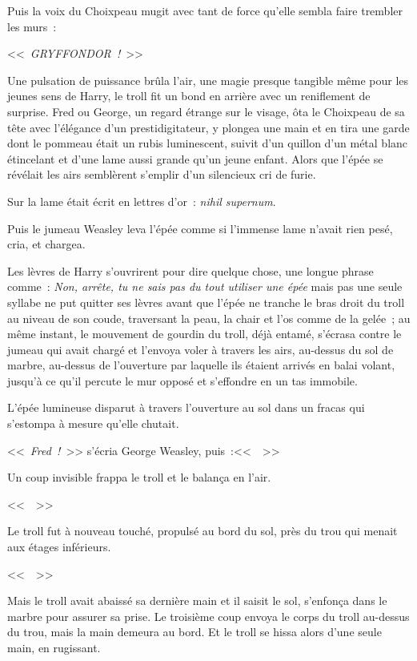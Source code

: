 Puis la voix du Choixpeau mugit avec tant de force qu'elle sembla faire trembler les murs~:

<<~\emph{GRYFFONDOR~!}~>>

Une pulsation de puissance brûla l'air, une magie presque tangible même pour les jeunes sens de Harry, le troll fit un bond en arrière avec un reniflement de surprise. Fred ou George, un regard étrange sur le visage, ôta le Choixpeau de sa tête avec l'élégance d'un prestidigitateur, y plongea une main et en tira une garde dont le pommeau était un rubis luminescent, suivit d'un quillon d'un métal blanc étincelant et d'une lame aussi grande qu'un jeune enfant. Alors que l'épée se révélait les airs semblèrent s'emplir d'un silencieux cri de furie.

Sur la lame était écrit en lettres d'or~: \emph{nihil supernum}.

Puis le jumeau Weasley leva l'épée comme si l'immense lame n'avait rien pesé, cria, et chargea.

Les lèvres de Harry s'ouvrirent pour dire quelque chose, une longue phrase comme~: \emph{Non, arrête, tu ne sais pas du tout utiliser une épée} mais pas une seule syllabe ne put quitter ses lèvres avant que l'épée ne tranche le bras droit du troll au niveau de son coude, traversant la peau, la chair et l'os comme de la gelée~; au même instant, le mouvement de gourdin du troll, déjà entamé, s'écrasa contre le jumeau qui avait chargé et l'envoya voler à travers les airs, au-dessus du sol de marbre, au-dessus de l'ouverture par laquelle ils étaient arrivés en balai volant, jusqu'à ce qu'il percute le mur opposé et s'effondre en un tas immobile.

L'épée lumineuse disparut à travers l'ouverture au sol dans un fracas qui s'estompa à mesure qu'elle chutait.

<<~\emph{Fred~!}~>> s'écria George Weasley, puis~:<<~~>>

Un coup invisible frappa le troll et le balança en l'air.

<<~~>>

Le troll fut à nouveau touché, propulsé au bord du sol, près du trou qui menait aux étages inférieurs.

<<~~>>

Mais le troll avait abaissé sa dernière main et il saisit le sol, s'enfonça dans le marbre pour assurer sa prise. Le troisième coup envoya le corps du troll au-dessus du trou, mais la main demeura au bord. Et le troll se hissa alors d'une seule main, en rugissant.

